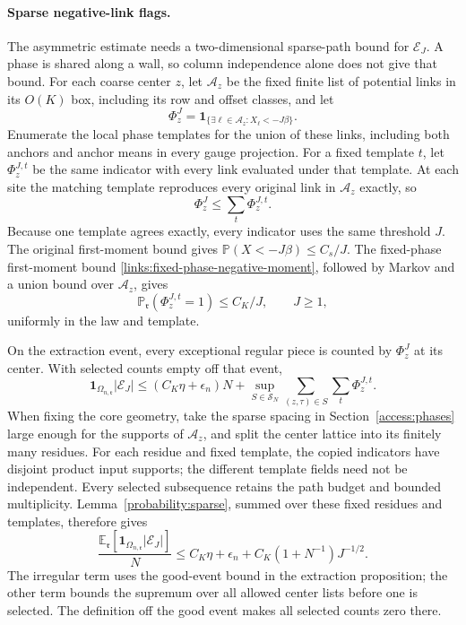 \paragraph{Sparse negative-link flags.}
The asymmetric estimate needs a two-dimensional sparse-path bound for
\(\mathcal E_J\). A phase is shared along a wall, so column independence
alone does not give that bound. For each coarse center \(z\), let
\(\mathcal A_z\) be the fixed finite list of potential links in its
\(O(K)\) box, including its row and offset classes, and let
\[
 \Phi_z^{J}=\mathbf1_{\{\exists \ell\in\mathcal A_z:
                                      X_\ell<-J\beta\}}.
\]
Enumerate the local phase templates for the union of these links,
including both anchors and anchor means in every gauge projection.
For a fixed template \(t\), let \(\Phi_z^{J,t}\) be the same indicator
with every link evaluated under that template. At each site the
matching template reproduces every original link in \(\mathcal A_z\)
exactly, so
\[
 \Phi_z^J\le\sum_t\Phi_z^{J,t}.
\]
Because one template agrees exactly, every indicator uses the same
threshold \(J\).
The original first-moment bound gives
\(\mathbb P(X<-J\beta)\le C_s/J\). The fixed-phase first-moment bound
\eqref{links:fixed-phase-negative-moment}, followed by Markov and a
union bound over \(\mathcal A_z\), gives
\[
 \mathbb P_{\mathfrak r}(\Phi_z^{J,t}=1)\le C_K/J,\qquad J\ge1,
\]
uniformly in the law and template.

On the extraction event, every exceptional regular piece is counted
by \(\Phi_z^J\) at its center. With selected counts empty off that event,
\[
 \mathbf1_{\Omega_{n,\mathfrak r}}|\mathcal E_J|
 \le (C_K\eta+\epsilon_n)N+
   \sup_{S\in\mathcal S_N}\sum_{(z,\tau)\in S}\sum_t\Phi_z^{J,t}.
\]
When fixing the core geometry, take the sparse spacing in
Section~\ref{access:phases} large enough for the supports of
\(\mathcal A_z\), and split the center lattice into its finitely many
residues. For each residue and fixed template,
the copied indicators have disjoint product input supports; the
different template fields need not be independent. Every selected
subsequence retains the path budget and bounded multiplicity.
Lemma~\ref{probability:sparse}, summed over these fixed residues and
templates, therefore gives
\begin{equation}
 \frac{\mathbb E_{\mathfrak r}
       [\mathbf1_{\Omega_{n,\mathfrak r}}|\mathcal E_J|]}{N}
 \le C_K\eta+\epsilon_n+C_K(1+N^{-1})J^{-1/2}.
 \label{links:sparse-flags}
\end{equation}
The irregular term uses the good-event bound in the extraction
proposition; the other term bounds the supremum over all allowed
center lists before one is selected. The definition off the good
event makes all selected counts zero there.

